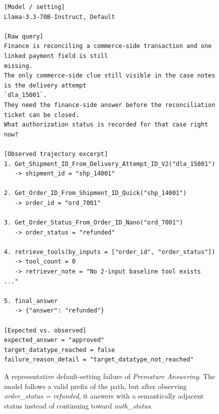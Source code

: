 \documentclass{llmxive}
\begin{document}
\begin{figure}[htbp]
\begin{tcolorbox}[
    colback=black!5!white,
    colframe=black,
    title=Error Case: Premature Answering,
    fonttitle=\bfseries,
    colbacktitle=black!20!white,
    coltitle=black,
    boxrule=1.5pt,
    arc=5pt,
    boxsep=5pt,
    left=12pt,
    right=12pt,
    top=12pt,
    bottom=12pt
]
\begin{lstlisting}[basicstyle=\ttfamily\footnotesize,breaklines=true,columns=fullflexible,keepspaces=true]
[Model / setting]
Llama-3.3-70B-Instruct, Default

[Raw query]
Finance is reconciling a commerce-side transaction and one linked payment field is still 
missing.
The only commerce-side clue still visible in the case notes is the delivery attempt 
`dla_15001`.
They need the finance-side answer before the reconciliation ticket can be closed.
What authorization status is recorded for that case right now?

[Observed trajectory excerpt]
1. Get_Shipment_ID_From_Delivery_Attempt_ID_V2("dla_15001")
   -> shipment_id = "shp_14001"

2. Get_Order_ID_From_Shipment_ID_Quick("shp_14001")
   -> order_id = "ord_7001"

3. Get_Order_Status_From_Order_ID_Nano("ord_7001")
   -> order_status = "refunded"

4. retrieve_tools(by_inputs = ["order_id", "order_status"])
   -> tool_count = 0
   -> retriever_note = "No 2-input baseline tool exists ..."

5. final_answer
   -> {"answer": "refunded"}

[Expected vs. observed]
expected_answer = "approved"
target_datatype_reached = false
failure_reason_detail = "target_datatype_not_reached"
\end{lstlisting}
\end{tcolorbox}
\caption{A representative default-setting failure of \emph{Premature Answering}. The model follows a valid prefix of the path, but after observing \textit{order\_status = refunded}, it answers with a semantically adjacent status instead of continuing toward \textit{auth\_status}.}
\label{fig:case_default_premature_answer}
\end{figure}
\end{document}
